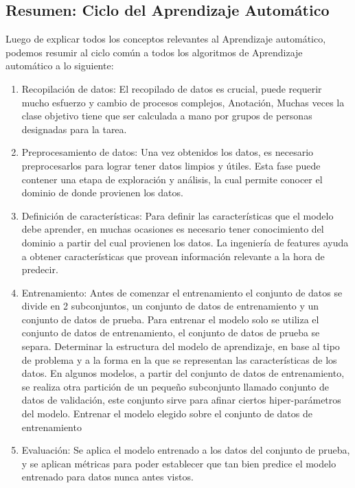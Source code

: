 \documentclass[a4paper,11pt,spanish]{book}
\begin{document}
    \subsection{Resumen: Ciclo del Aprendizaje Automático}
      Luego de explicar todos los conceptos relevantes al Aprendizaje automático, podemos resumir al ciclo común a todos los algoritmos de Aprendizaje automático a lo siguiente:
      \begin{enumerate}
	\item Recopilación de datos:
	  El recopilado de datos es crucial, puede requerir mucho esfuerzo y cambio de procesos complejos,
	  Anotación, Muchas veces la clase objetivo tiene que ser calculada a mano por grupos de personas designadas para la tarea.
	\item Preprocesamiento de datos: Una vez obtenidos los datos, es necesario preprocesarlos para lograr tener datos limpios y útiles. Esta fase puede contener una etapa
	  de exploración y análisis, la cual permite conocer el dominio de donde provienen los datos.
	\item Definición de características: Para definir las características que el modelo debe aprender, en muchas ocasiones es necesario tener conocimiento del dominio a partir del cual provienen los datos.
	  La ingeniería de features ayuda a obtener características que provean información relevante a la hora de predecir.
	\item Entrenamiento:
	  \subitem Antes de comenzar el entrenamiento el conjunto de datos se divide en 2 subconjuntos, un conjunto de datos de entrenamiento y un conjunto de datos de prueba.
	  \subitem Para entrenar el modelo solo se utiliza el conjunto de datos de entrenamiento, el conjunto de datos de prueba se separa.
	  \subitem Determinar la estructura del modelo de aprendizaje, en base al tipo de problema y a la forma en la que se representan las características de los datos.
	  \subitem En algunos modelos, a partir del conjunto de datos de entrenamiento, se realiza otra partición de un pequeño subconjunto llamado conjunto de datos de validación, este conjunto sirve
	  para afinar ciertos hiper-parámetros del modelo.
	  \subitem Entrenar el modelo elegido sobre el conjunto de datos de entrenamiento
	\item Evaluación: Se aplica el modelo entrenado a los datos del conjunto de prueba, y se aplican métricas para poder establecer que tan bien predice el modelo entrenado para datos nunca antes vistos.
      \end{enumerate}
\end{document}
